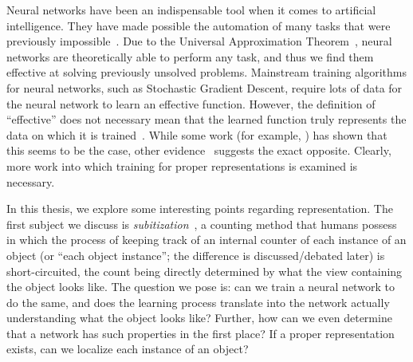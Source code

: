 Neural networks have been an indispensable tool when it comes to artificial intelligence. They have
made possible the automation of many tasks that were previously impossible~\cite{redmon2016look,
ILSVRC15}. Due to the Universal Approximation Theorem~\cite{HORNIK1989359}, neural networks are
theoretically able to perform any task, and thus we find them effective at solving previously
unsolved problems. Mainstream training algorithms for neural networks, such as Stochastic Gradient
Descent, require lots of data for the neural network to learn an effective function. However, the
definition of ``effective'' does not necessary mean that the learned function truly represents the
data on which it is trained~\cite{szegedy2014intriguing}. While some work (for example,
\cite{yosinski2015understanding}) has shown that this seems to be the case, other
evidence~\cite{szegedy2014intriguing} suggests the exact opposite. Clearly, more work into which
training for proper representations is examined is necessary.

In this thesis, we explore some interesting points regarding representation. The first subject we
discuss is \textit{subitization}~\cite{10.2307/1418556, subitizingyoutube}, a counting method that
humans possess in which the process of keeping track of an internal counter of each instance of an
object (or ``each object instance''; the difference is discussed/debated later) is short-circuited,
the count being directly determined by what the view containing the object looks like. The question
we pose is: can we train a neural network to do the same, and does the learning process translate
into the network actually understanding what the object looks like? Further, how can we even
determine that a network has such properties in the first place? If a proper representation exists,
can we localize each instance of an object?

